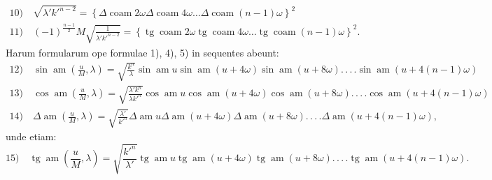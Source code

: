 \documentclass{article}
\begin{document}
\[
\begin{gathered}
\text{10)}\quad\sqrt{\lambda'k'^{n-2}}=\left\{\Delta\operatorname{coam}2\omega\Delta\operatorname{coam}4\omega\ldots\Delta\operatorname{coam}(n-1)\omega\right\}^{2}\\[1.5ex]
\text{11)}\quad(-1)^{\frac{n-1}{2}}M\sqrt{\frac{1}{\lambda'k'^{n-2}}}=\left\{\operatorname{tg}\operatorname{coam}2\omega\operatorname{tg}\operatorname{coam}4\omega\ldots\operatorname{tg}\operatorname{coam}(n-1)\omega\right\}^{2}.
\end{gathered}
\]
Harum formularum ope formulae 1), 4), 5) in sequentes abeunt:
\[
\begin{gathered}
\text{12)}\quad\sin\operatorname{am}\left(\frac{u}{M},\lambda\right)=\sqrt{\frac{k^{n}}{\lambda}}\sin\operatorname{am}u\sin\operatorname{am}(u+4\omega)\sin\operatorname{am}(u+8\omega).\,.\,.\,.\sin\operatorname{am}(u+4(n-1)\omega)\\[1.5ex]
\text{13)}\quad\cos\operatorname{am}\left(\frac{u}{M},\lambda\right)=\sqrt{\frac{\lambda'k^{n}}{\lambda k'^{n}}}\cos\operatorname{am}u\cos\operatorname{am}(u+4\omega)\cos\operatorname{am}(u+8\omega).\,.\,.\,.\cos\operatorname{am}(u+4(n-1)\omega)\\[1.5ex]
\text{14)}\quad\Delta\operatorname{am}\left(\frac{u}{M},\lambda\right)=\sqrt{\frac{\lambda'}{k'^{n}}}\Delta\operatorname{am}u\Delta\operatorname{am}(u+4\omega)\Delta\operatorname{am}(u+8\omega).\,.\,.\,.\Delta\operatorname{am}(u+4(n-1)\omega),
\end{gathered}
\]
unde etiam:
\[
\text{15)}\quad\operatorname{tg}\operatorname{am}\left(\frac{u}{M},\lambda\right)=\sqrt{\frac{k'^{n}}{\lambda'}}\operatorname{tg}\operatorname{am}u\operatorname{tg}\operatorname{am}(u+4\omega)\operatorname{tg}\operatorname{am}(u+8\omega).\,.\,.\,.\operatorname{tg}\operatorname{am}(u+4(n-1)\omega).
\]
\end{document}
